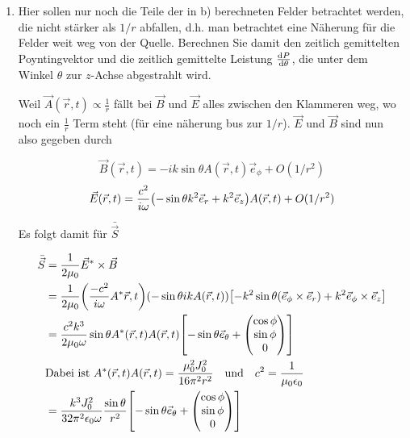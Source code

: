 \begin{enumerate}[label=\alph*)]
  \item Hier sollen nur noch die Teile der in b) berechneten Felder
    betrachtet werden, die nicht stärker als $1/r$ abfallen, d.h. man
    betrachtet eine Näherung für die Felder weit weg von der Quelle.
    Berechnen Sie damit den zeitlich gemittelten Poyntingvektor und
    die zeitlich gemittelte Leistung $\dv {P}{\theta}$, die unter dem
    Winkel $\theta$ zur $z$-Achse abgestrahlt wird.

    Weil $\vec A(\vec r, t)\propto \frac{1}{r}$ fällt bei $\vec B$ und 
    $\vec E$ alles zwischen den Klammeren weg, wo noch 
    ein $\frac{1}{r}$ Term
    steht (für eine näherung bus zur $1/r$). $\vec E$ und $\vec B$ sind
    nun also gegeben durch

    \begin{equation}
      \vec B(\vec r, t) = -ik\sin\theta A(\vec r, t)\vec e_\phi
      +O(1/r^2)
    \end{equation}
    \begin{equation}
      \vec E(\vec r, t) 
      = \frac{c^2}{i\omega} \qty(-\sin\theta k^2\vec e_r+k^2 \vec e_z)
      A(\vec r, t)
      +O(1/r^2)
    \end{equation}

    Es folgt damit für 
    $\bar{\vec{S}}$
    
    \begin{equation}
      \begin{split}
        \bar{\vec{S}}
        &= \frac{1}{2\mu_0} \vec E^* \times \vec B\\
        &=\frac{1}{2\mu_0}\qty(\frac{-c^2}{i\omega}A^*{\vec r, t})
        \qty(-\sin\theta ik A(\vec r, t))
        \qty[-k^2\sin\theta (\vec e_\phi \times \vec e_r)
        +k^2 \vec e_\phi \times \vec e_z
        ]\\
        &= \frac{c^2k^3}{2\mu_0 \omega}\sin\theta A^*(\vec r, t)A(\vec r, t)
        \qty[-\sin\theta\vec e_\theta + 
        \begin{pmatrix}
          \cos\phi\\\sin\phi\\0
        \end{pmatrix}
        ]\\
        &\text{Dabei ist}\ 
        A^*(\vec r,t)A(\vec r, t)=\frac{\mu_0^2J_0^2}{16\pi^2r^2}
        \quad\text{und}\quad
        c^2=\frac{1}{\mu_0\epsilon_0}\\
        &= \frac{k^3J_0^2}{32\pi^2\epsilon_0\omega} 
        \frac{\sin\theta}{r^2}
        \qty[-\sin\theta \vec e_\theta+
        \begin{pmatrix}
          \cos\phi\\\sin\phi\\0
        \end{pmatrix}
        ]
      \end{split}
    \end{equation}
    

\end{enumerate}
